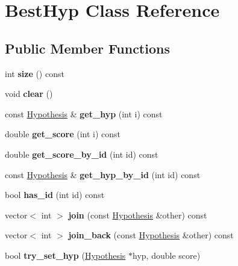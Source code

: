 \hypertarget{classBestHyp}{
\section{BestHyp Class Reference}
\label{classBestHyp}
}
\subsection*{Public Member Functions}
\begin{DoxyCompactItemize}
\item 
\hypertarget{classBestHyp_ae52bda66762f0445bf476d2f43bb4fdc}{
int {\bfseries size} () const }
\label{classBestHyp_ae52bda66762f0445bf476d2f43bb4fdc}

\item 
\hypertarget{classBestHyp_a2a8ff799ae985c12d5263e9680c22791}{
void {\bfseries clear} ()}
\label{classBestHyp_a2a8ff799ae985c12d5263e9680c22791}

\item 
\hypertarget{classBestHyp_a3ebe1ca44ef5cc63cdee7e2da2e797fc}{
const \hyperlink{structHypothesis}{Hypothesis} \& {\bfseries get\_\-hyp} (int i) const }
\label{classBestHyp_a3ebe1ca44ef5cc63cdee7e2da2e797fc}

\item 
\hypertarget{classBestHyp_ab7d3391615e91709ad0ddae212e24553}{
double {\bfseries get\_\-score} (int i) const }
\label{classBestHyp_ab7d3391615e91709ad0ddae212e24553}

\item 
\hypertarget{classBestHyp_ab29d6a90e03ea75a1ef753305450c9b3}{
double {\bfseries get\_\-score\_\-by\_\-id} (int id) const }
\label{classBestHyp_ab29d6a90e03ea75a1ef753305450c9b3}

\item 
\hypertarget{classBestHyp_a48d8ad9aaca135380f5715a016854111}{
const \hyperlink{structHypothesis}{Hypothesis} \& {\bfseries get\_\-hyp\_\-by\_\-id} (int id) const }
\label{classBestHyp_a48d8ad9aaca135380f5715a016854111}

\item 
\hypertarget{classBestHyp_af9bf103ad20a0f3735187f56dabd2c22}{
bool {\bfseries has\_\-id} (int id) const }
\label{classBestHyp_af9bf103ad20a0f3735187f56dabd2c22}

\item 
\hypertarget{classBestHyp_afda98d488d1d1bd88466a9f82b45f345}{
vector$<$ int $>$ {\bfseries join} (const \hyperlink{structHypothesis}{Hypothesis} \&other) const }
\label{classBestHyp_afda98d488d1d1bd88466a9f82b45f345}

\item 
\hypertarget{classBestHyp_a494f9dfd45f21c54c768d501dc6853ce}{
vector$<$ int $>$ {\bfseries join\_\-back} (const \hyperlink{structHypothesis}{Hypothesis} \&other) const }
\label{classBestHyp_a494f9dfd45f21c54c768d501dc6853ce}

\item 
\hypertarget{classBestHyp_aafdafca111e5bec1ddb589ee9726b398}{
bool {\bfseries try\_\-set\_\-hyp} (\hyperlink{structHypothesis}{Hypothesis} $\ast$hyp, double score)}
\label{classBestHyp_aafdafca111e5bec1ddb589ee9726b398}

\end{DoxyCompactItemize}

